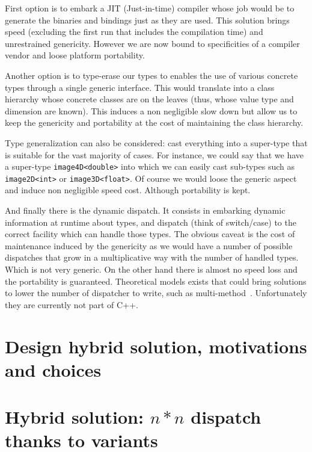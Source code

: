 First option is to embark a JIT (Just-in-time) compiler whose job would be to generate the binaries and bindings just as
they are used. This solution brings speed (excluding the first run that includes the compilation time) and unrestrained
genericity. However we are now bound to specificities of a compiler vendor and loose platform portability.

Another option is to type-erase our types to enables the use of various concrete types through a single generic
interface. This would translate into a class hierarchy whose concrete classes are on the leaves (thus, whose value type
and dimension are known). This induces a non negligible slow down but allow us to keep the genericity and portability at
the cost of maintaining the class hierarchy.

Type generalization can also be considered: cast everything into a super-type that is suitable for the vast majority of
cases. For instance, we could say that we have a super-type \texttt{image4D<double>} into which we can easily cast
sub-types such as \texttt{image2D<int>} or \texttt{image3D<float>}. Of course we would loose the generic aspect and
induce non negligible speed cost. Although portability is kept.

And finally there is the dynamic dispatch. It consists in embarking dynamic information at runtime about types, and
dispatch (think of switch/case) to the correct facility which can handle those types. The obvious caveat is the cost of
maintenance induced by the genericity as we would have a number of possible dispatches that grow in a multiplicative way
with the number of handled types. Which is not very generic. On the other hand there is almost no speed loss and the
portability is guaranteed. Theoretical models exists that could bring solutions to lower the number of dispatcher to
write, such as multi-method~\cite{pirkelbauer.2010.multimethods}. Unfortunately they are currently not part of C++.

\section{Design hybrid solution, motivations and choices}


\section{Hybrid solution: $n*n$ dispatch thanks to variants}

